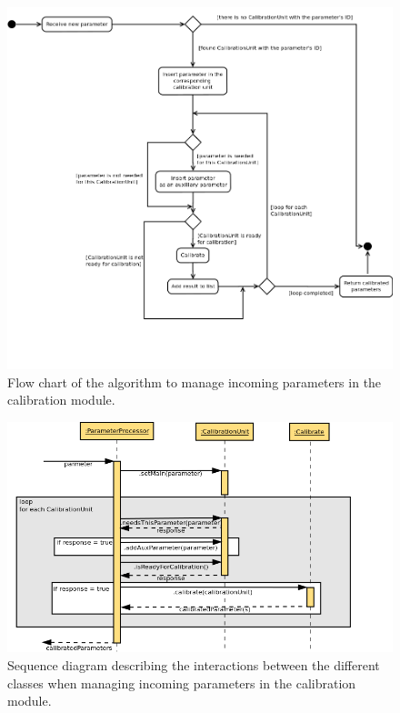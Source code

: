 \begin{figure}[H]
\centerline{\includegraphics[width=1.2\textwidth]{images/ReceiveParameterAndCalibrateFlowChart.png}}
\caption{Flow chart of the algorithm to manage incoming parameters in the calibration module.}
\label{f5.5}
\end{figure}


\begin{figure}[H]
\centerline{\includegraphics[width=1.2\textwidth]{images/ReceiveParameterAndCalibrateSequence.png}}
\caption{Sequence diagram describing the interactions between the different classes when managing incoming parameters in the calibration module.}
\label{f5.6}
\end{figure}



